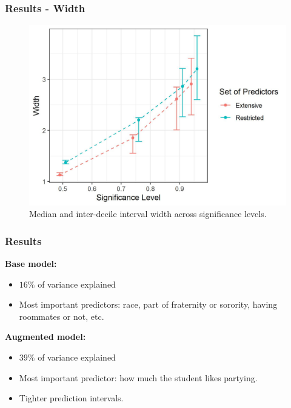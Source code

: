 \documentclass{beamer}
\begin{document}
\begin{frame} \frametitle{Results - Width}   
\begin{figure}
	\centering
	\includegraphics[scale = 0.5]{conformal.jpeg}
	\caption{Median and inter-decile interval width across significance levels.}
	\label{fig:conformal}
\end{figure}
\end{frame}


\begin{frame} \frametitle{Results}

\textbf{Base model:}
\begin{itemize}
	\item $16\%$ of variance explained
	\item Most important predictors: race, part of fraternity or sorority, having roommates or not, etc.
\end{itemize}

\textbf{Augmented model:} 
\begin{itemize}
	\item $39\%$ of variance explained
	\item Most important predictor: how much the student likes partying.
	\item Tighter prediction intervals.
\end{itemize}

\end{frame}
\end{document}
